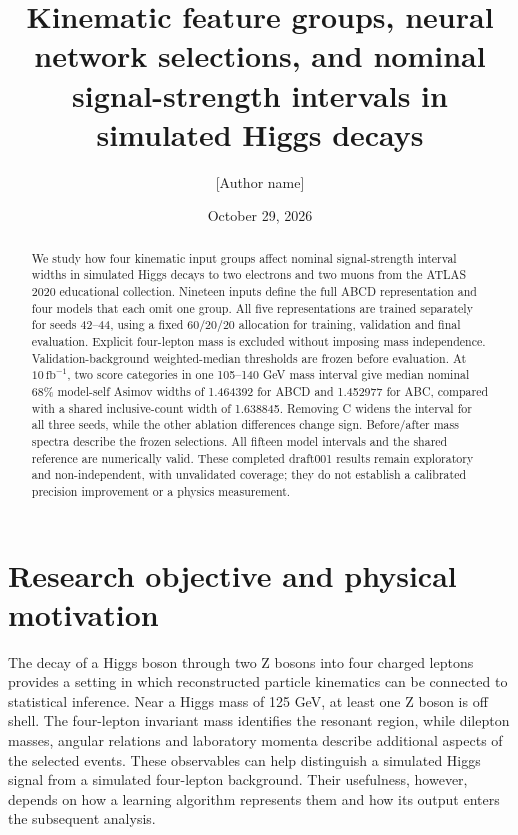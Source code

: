 \documentclass[aps,prd,reprint,superscriptaddress,nofootinbib,longbibliography,floatfix]{revtex4-2}
\begin{document}
\title{Kinematic feature groups, neural network selections, and nominal
signal-strength intervals in simulated Higgs decays}
\author{[Author name]}
\date{October 29, 2026}

\begin{abstract}
We study how four kinematic input groups affect nominal signal-strength interval
widths in simulated Higgs decays to two electrons and two muons from the ATLAS
2020 educational collection. Nineteen inputs define the full ABCD representation
and four models that each omit one group. All five representations are trained
separately for seeds 42--44, using a fixed 60/20/20 allocation for training,
validation and final evaluation. Explicit four-lepton mass is excluded without
imposing mass independence. Validation-background weighted-median thresholds are
frozen before evaluation. At $10\,\mathrm{fb}^{-1}$, two score categories in one
105--140 GeV mass interval give median nominal 68\% model-self Asimov widths of
1.464392 for ABCD and 1.452977 for ABC, compared with a shared inclusive-count
width of 1.638845. Removing C widens the interval for all three seeds, while the
other ablation differences change sign. Before/after mass spectra describe the
frozen selections. All fifteen model intervals and the shared reference are
numerically valid. These completed draft001 results remain exploratory and
non-independent, with unvalidated coverage; they do not establish a calibrated
precision improvement or a physics measurement.
\end{abstract}
\maketitle

\section{Research objective and physical motivation}

The decay of a Higgs boson through two Z bosons into four charged leptons provides a setting
in which reconstructed particle kinematics can be connected to statistical inference. Near a
Higgs mass of 125 GeV, at least one Z boson is off shell. The four-lepton invariant mass
identifies the resonant region, while dilepton masses, angular relations and laboratory
momenta describe additional aspects of the selected events. These observables can help
distinguish a simulated Higgs signal from a simulated four-lepton background. Their
usefulness, however, depends on how a learning algorithm represents them and how its output
enters the subsequent analysis.
\end{document}
